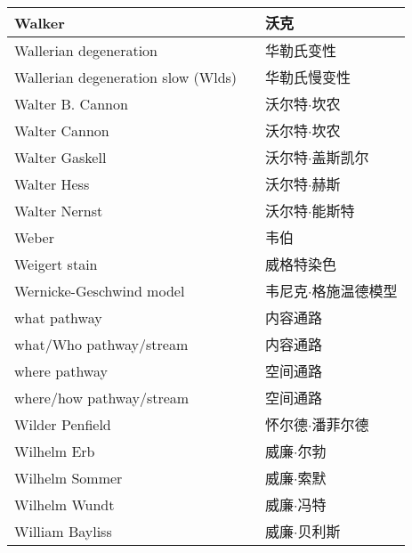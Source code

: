 \begin{longtable}{lll}
	\midrule
	Walker  && 沃克  \\
	
	\midrule
	Wallerian degeneration  && 华勒氏变性  \\
	
	\midrule
	Wallerian degeneration slow (Wlds) && 华勒氏慢变性  \\
	
	\midrule
	Walter B. Cannon  && 沃尔特$\cdot$坎农  \\
	
	\midrule
	Walter Cannon  && 沃尔特$\cdot$坎农  \\
	
	\midrule
	Walter Gaskell  && 沃尔特$\cdot$盖斯凯尔  \\
	
	\midrule
	Walter Hess  && 沃尔特$\cdot$赫斯  \\
	
	\midrule
	Walter Nernst  && 沃尔特$\cdot$能斯特  \\
	
	\midrule
	Weber  && 韦伯  \\
	
	\midrule
	Weigert stain  && 威格特染色  \\
	
	\midrule
	Wernicke-Geschwind model  && 韦尼克$\cdot$格施温德模型  \\
	
	\midrule
	what pathway  && 内容通路  \\
	
	\midrule
	what/Who pathway/stream  && 内容通路  \\
	
	\midrule
	where pathway && 空间通路  \\
	
	\midrule
	where/how pathway/stream && 空间通路  \\
	
	\midrule
	Wilder Penfield && 怀尔德$\cdot$潘菲尔德  \\
	
	\midrule
	Wilhelm Erb && 威廉$\cdot$尔勃  \\
	
	\midrule
	Wilhelm Sommer && 威廉$\cdot$索默  \\
	
	\midrule
	Wilhelm Wundt && 威廉$\cdot$冯特  \\
	
	\midrule
	William Bayliss && 威廉$\cdot$贝利斯  \\
	

\end{longtable}
